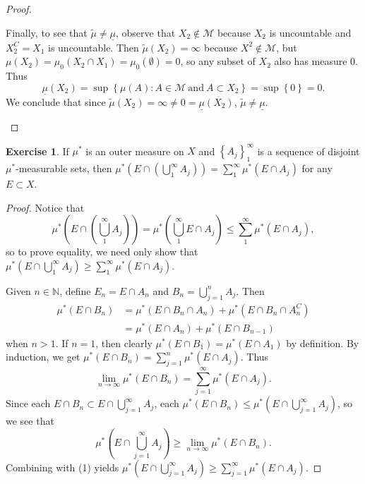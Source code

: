 \documentclass{article}
\theoremstyle{definition}
\newtheorem{ex}{Exercise}
\begin{document}
\begin{proof}
\begin{enumerate}[label=\textbf{\alph*.}]
		      Finally, to see that $\widetilde{\mu} \neq \underline{\mu}$, observe that $X_2 \notin \mathscr{M}$ because $X_2$ is uncountable and $X_2^C = X_1$ is uncountable.
		      Then $\widetilde{\mu}(X_2) = \infty$ because $X^2 \notin \mathscr{M}$, but $\mu(X_2) = \mu_0(X_2 \cap X_1) = \mu_0(\emptyset) = 0$, so any subset of $X_2$ also has measure 0.
		      Thus \begin{equation*}
			      \underline{\mu}(X_2) = \sup \left\lbrace \mu(A) : A \in \mathscr{M}\ \mathrm{and}\ A \subset X_2 \right\rbrace = \sup \left\lbrace 0 \right\rbrace = 0.
		      \end{equation*}
		      We conclude that since $\widetilde{\mu}(X_2) = \infty \neq 0  = \underline{\mu}(X_2)$, $\widetilde{\mu} \neq \underline{\mu}$.
	\end{enumerate}
\end{proof}

\begin{ex}
	If $\mu^*$ is an outer measure on $X$ and $\left\lbrace A_j \right\rbrace _{1}^{\infty}$ is a sequence of disjoint $\mu^*$-measurable sets, then $\mu^*(E \cap (\bigcup_1^\infty A_j)) = \sum_1^\infty \mu^*(E \cap A_j)$ for any $E \subset X$.
\end{ex}
\begin{proof}
	Notice that \begin{equation*}
		\mu^* \left( E \cap \left( \bigcup_1^\infty A_j \right) \right) = \mu^* \left( \bigcup_1^\infty E \cap A_j \right) \leq \sum_1^\infty \mu^* \left( E \cap A_j \right),
	\end{equation*}
	so to prove equality, we need only show that $\mu^* \left( E \cap \bigcup_1^\infty A_j \right) \geq \sum_1^\infty \mu^* \left( E \cap A_j \right)$.

	Given $n \in \mathbb{N}$, define $E_n = E \cap A_n$ and $B_n = \bigcup_{j = 1}^n A_j$.
	Then \begin{align*}
		\mu^*(E \cap B_n) & = \mu^*(E \cap B_n \cap A_n) + \mu^*(E \cap B_n \cap A_n^C) \\
		                  & = \mu^*(E \cap A_n) + \mu^*(E \cap B_{n - 1})
	\end{align*}
	when $n > 1$.
	If $n = 1$, then clearly $\mu^*(E \cap B_1) = \mu^*(E \cap A_1)$ by definition.
	By induction, we get $\mu^*(E \cap B_n) = \sum_{j = 1}^n \mu^*(E \cap A_j)$.
	Thus \begin{equation*}
		\lim_{n \to \infty} \mu^*(E \cap B_n) = \sum_{j = 1}^\infty \mu^*(E \cap A_j). \tag{1}
	\end{equation*}
	Since each $E \cap B_n \subset E \cap \bigcup_{j = 1}^\infty A_j$, each $\mu^*(E \cap B_n) \leq \mu^*(E \cap \bigcup_{j = 1}^\infty A_j)$, so we see that \begin{equation*}
		\mu^*(E \cap \bigcup_{j = 1}^\infty A_j) \geq \lim_{n \to \infty} \mu^*(E \cap B_n).
	\end{equation*}
	Combining with (1) yields $\mu^*(E \cap \bigcup_{j = 1}^\infty A_j) \geq \sum_{j = 1}^\infty \mu^*(E \cap A_j)$.
\end{proof}
\end{document}
